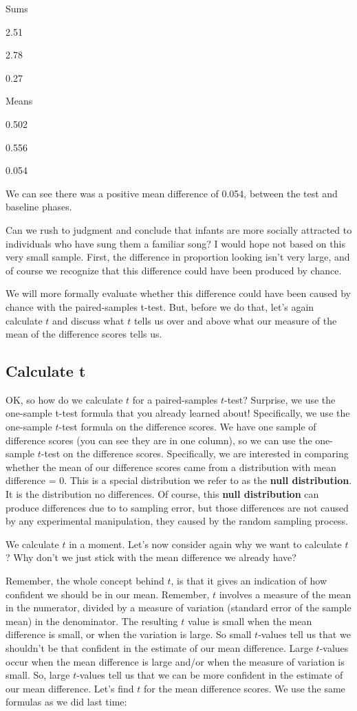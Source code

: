 \documentclass[
]{book}
\begin{document}
Sums

2.51

2.78

0.27

Means

0.502

0.556

0.054

We can see there was a positive mean difference of 0.054, between the test and baseline phases.

Can we rush to judgment and conclude that infants are more socially attracted to individuals who have sung them a familiar song? I would hope not based on this very small sample. First, the difference in proportion looking isn't very large, and of course we recognize that this difference could have been produced by chance.

We will more formally evaluate whether this difference could have been caused by chance with the paired-samples t-test. But, before we do that, let's again calculate \(t\) and discuss what \(t\) tells us over and above what our measure of the mean of the difference scores tells us.

\hypertarget{calculate-t}{%
\subsection{Calculate t}\label{calculate-t}}

OK, so how do we calculate \(t\) for a paired-samples \(t\)-test? Surprise, we use the one-sample t-test formula that you already learned about! Specifically, we use the one-sample \(t\)-test formula on the difference scores. We have one sample of difference scores (you can see they are in one column), so we can use the one-sample \(t\)-test on the difference scores. Specifically, we are interested in comparing whether the mean of our difference scores came from a distribution with mean difference = 0. This is a special distribution we refer to as the \textbf{null distribution}. It is the distribution no differences. Of course, this \textbf{null distribution} can produce differences due to to sampling error, but those differences are not caused by any experimental manipulation, they caused by the random sampling process.

We calculate \(t\) in a moment. Let's now consider again why we want to calculate \(t\)? Why don't we just stick with the mean difference we already have?

Remember, the whole concept behind \(t\), is that it gives an indication of how confident we should be in our mean. Remember, \(t\) involves a measure of the mean in the numerator, divided by a measure of variation (standard error of the sample mean) in the denominator. The resulting \(t\) value is small when the mean difference is small, or when the variation is large. So small \(t\)-values tell us that we shouldn't be that confident in the estimate of our mean difference. Large \(t\)-values occur when the mean difference is large and/or when the measure of variation is small. So, large \(t\)-values tell us that we can be more confident in the estimate of our mean difference. Let's find \(t\) for the mean difference scores. We use the same formulas as we did last time:
\end{document}
